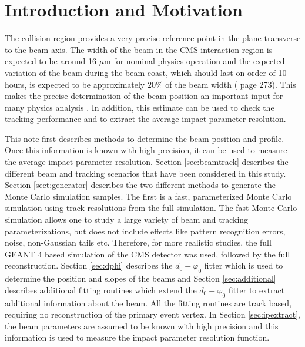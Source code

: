 \documentclass{cmspaper}
\begin{document}
\setcounter{page}{2}%


\section{Introduction and Motivation} 
The collision region  provides a very precise reference point in the plane transverse to the beam axis. The 
width of the beam in the CMS interaction region is expected to  be around 16 $\mu$m for nominal physics operation and the expected variation
of the beam during the beam coast, which should last on order of 10 hours, is expected to be approximately $20 \%$ of the beam width 
(\cite{PhysTDCVol1} page 273).
This makes the precise determination of the beam position an important input for 
many physics analysis \cite{ANAL}. In addition, this estimate can be used to check the tracking performance and to extract the average impact 
parameter resolution. 

This note first describes methods to determine the beam position and profile. Once this information is known with high precision, it
can be used to measure the average impact parameter resolution. 
Section \ref{sec:beamtrack}  describes the different beam and tracking scenarios that have been considered in this study. 
Section \ref{sect:generator} describes the two  different methods to generate the Monte Carlo simulation samples. The  
first is a fast, parameterized Monte Carlo simulation using track resolutions from the full simulation. %
The fast Monte Carlo simulation allows one to study a large variety 
of beam and tracking parameterizations, but does not include effects like pattern recognition errors, noise, non-Gaussian tails etc. Therefore, for more realistic studies, the full GEANT 4 based simulation of the CMS detector  was used, followed by the full reconstruction.
Section \ref{sec:dphi} describes the $d_0-\varphi_0$ fitter which  is used to determine the position and 
slopes of the beams and Section \ref{sec:additional} describes 
additional fitting routines which extend the $d_0-\varphi_0$ fitter to extract additional information
about the beam. All the fitting routines are track based, requiring no reconstruction of the 
primary event vertex. 
In Section \ref{sec:ipextract}, the beam parameters are assumed to be known  with high precision and this information is used to measure 
the impact parameter resolution function. 
\end{document}
